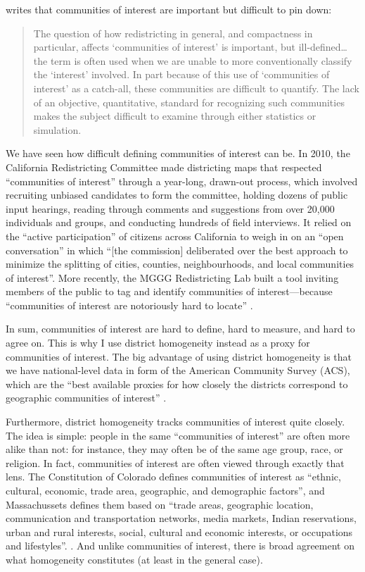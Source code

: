 \documentclass[]{article}
\begin{document}
\citeauthor{altman1998} writes that communities of interest are
important but difficult to pin down:

\begin{quote}
The question of how redistricting in general, and compactness in
particular, affects `communities of interest' is important, but
ill-defined\ldots{} the term is often used when we are unable to more
conventionally classify the `interest' involved. In part because of this
use of `communities of interest' as a catch-all, these communities are
difficult to quantify. The lack of an objective, quantitative, standard
for recognizing such communities makes the subject difficult to examine
through either statistics or simulation.
\end{quote}

We have seen how difficult defining communities of interest can be. In
2010, the California Redistricting Committee made districting maps that
respected ``communities of interest'' through a year-long, drawn-out
process, which involved recruiting unbiased candidates to form the
committee, holding dozens of public input hearings, reading through
comments and suggestions from over 20,000 individuals and groups, and
conducting hundreds of field interviews. It relied on the ``active
participation'' of citizens across California to weigh in on an ``open
conversation'' in which ``{[}the commission{]} deliberated over the best
approach to minimize the splitting of cities, counties, neighbourhoods,
and local communities of interest''. More recently, the MGGG
Redistricting Lab built a tool inviting members of the public to tag and
identify communities of interest---because ``communities of interest are
notoriously hard to locate'' \citep{mggg2020}.

In sum, communities of interest are hard to define, hard to measure, and
hard to agree on. This is why I use district homogeneity instead as a
proxy for communities of interest. The big advantage of using district
homogeneity is that we have national-level data in form of the American
Community Survey (ACS), which are the ``best available proxies for how
closely the districts correspond to geographic communities of interest''
\citet[p.~283]{steph2012}.

Furthermore, district homogeneity tracks communities of interest quite
closely. The idea is simple: people in the same ``communities of
interest'' are often more alike than not: for instance, they may often
be of the same age group, race, or religion. In fact, communities of
interest are often viewed through exactly that lens. The Constitution of
Colorado defines communities of interest as ``ethnic, cultural,
economic, trade area, geographic, and demographic factors'', and
Massachussets defines them based on ``trade areas, geographic location,
communication and transportation networks, media markets, Indian
reservations, urban and rural interests, social, cultural and economic
interests, or occupations and lifestyles''. \citep{brennan}. And unlike
communities of interest, there is broad agreement on what homogeneity
constitutes (at least in the general case).
\end{document}
